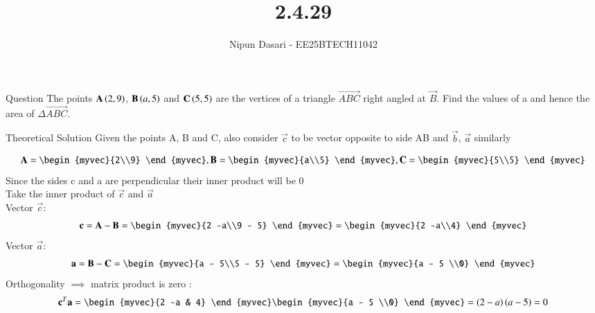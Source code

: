 \documentclass{beamer}
\title %
{2.4.29}
\author %
{Nipun Dasari - EE25BTECH11042}
\begin{document}
	
		\frame{\titlepage}
	\begin{frame}{Question}
	The points $\mathbf{A}\left(2, 9\right)$, $\mathbf{B}\left(a, 5\right)$ and $\mathbf{C}\left(5, 5\right)$ are the vertices of a triangle $\vec{ABC}$ right angled
	at $\vec{B}$. Find the values of a and hence the area of $\Delta\vec{ABC}$. \\
	\end{frame}

	
\begin{frame}{Theoretical Solution}
Given the points A, B and C, also consider $\vec{c}$ to be vector opposite to side AB and $\vec{b}$, $\vec{a}$ similarly

\begin{align}
	\vec{A} = \begin{myvec}{2\\9} \end{myvec} , \vec{B} = \begin{myvec}{a\\5} \end{myvec}, \vec{C} = \begin{myvec}{5\\5} \end{myvec}
\end{align}
Since the sides c and a are perpendicular their inner product will be 0\\
Take the inner product of $\vec{c}$ and $\vec{a}$\\
Vector $\vec{c}$:
\begin{align}
	\vec{c} = \vec{A}-\vec{B} = \begin{myvec}{2 -a\\9 - 5} \end{myvec} = \begin{myvec}{2 -a\\4} \end{myvec}
\end{align}
Vector $\vec{a}$:
\begin{align}
	\vec{a} = \vec{B}-\vec{C} = \begin{myvec}{a - 5\\5 - 5} \end{myvec} = \begin{myvec}{a - 5 \\0} \end{myvec}
\end{align}
Orthogonality $\implies$ matrix product is zero :
\begin{align}
	\vec{c}^T\vec{a} = \begin{myvec}{2 -a & 4} \end{myvec}\begin{myvec}{a - 5 \\0} \end{myvec} = \brak{2-a}\brak{a-5} = 0

\end{align}
\end{frame}
\end{document}

